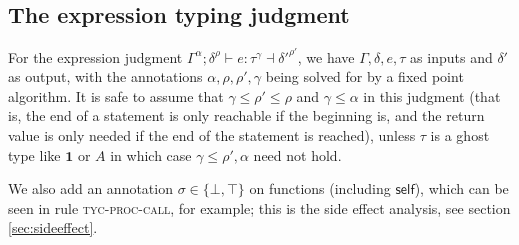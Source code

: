 \documentclass[acmsmall,nonacm]{acmart}
\newcommand{\proves}{\vdash}
\newcommand{\makes}{\dashv}
\begin{document}
\subsection{The expression typing judgment}

For the expression judgment $\Gamma^\alpha;\delta^{\rho} \proves e:\tau^\gamma\makes{\delta'}^{\rho'}$, we have $\Gamma,\delta,e,\tau$ as inputs and $\delta'$ as output, with the annotations $\alpha,\rho,\rho',\gamma$ being solved for by a fixed point algorithm. It is safe to assume that $\gamma\le \rho'\le \rho$ and $\gamma\le \alpha$ in this judgment (that is, the end of a statement is only reachable if the beginning is, and the return value is only needed if the end of the statement is reached), unless $\tau$ is a ghost type like $\mathbf{1}$ or $A$ in which case $\gamma\le \rho',\alpha$ need not hold.

We also add an annotation $\sigma\in\{\bot,\top\}$ on functions (including $\mathsf{self}$), which can be seen in rule \textsc{tyc-proc-call}, for example; this is the side effect analysis, see section \ref{sec:sideeffect}.
\end{document}
